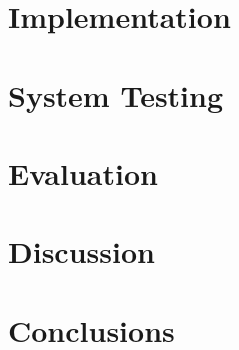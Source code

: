 \documentclass[11pt,openright,twoside,a4paper]{report}
\begin{document}
\chapter{Implementation}
\label{ch:chapter5}


\chapter{System Testing}
\label{ch:chapter6}








\chapter{Evaluation}
\label{ch:chapter7}


\chapter{Discussion}
\label{ch:chapter8}


\chapter{Conclusions}
\label{ch:chapter9}

\end{document}
